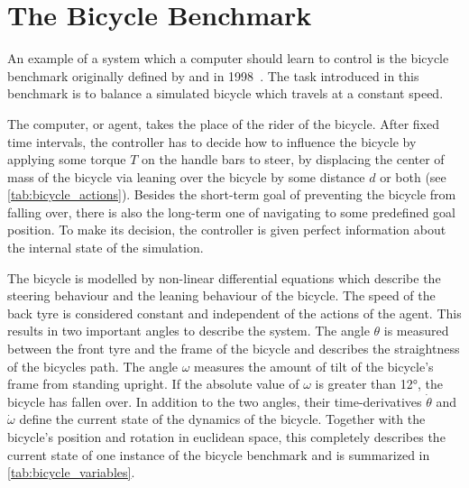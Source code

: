 \chapter{The Bicycle Benchmark}
\label{cha:the_bicycle_benchmark}

An example of a system which a computer should learn to control is the bicycle benchmark originally defined by \Randlov{} and \Alstrom{} in 1998~\cite{randlov_learning_1998}.
The task introduced in this benchmark is to balance a simulated bicycle which travels at a constant speed.

The computer, or agent, takes the place of the rider of the bicycle.
After fixed time intervals, the controller has to decide how to influence the bicycle by applying some torque $T$ on the handle bars to steer, by displacing the center of mass of the bicycle via leaning over the bicycle by some distance $d$ or both (see \cref{tab:bicycle_actions}).
Besides the short-term goal of preventing the bicycle from falling over, there is also the long-term one of navigating to some predefined goal position.
To make its decision, the controller is given perfect information about the internal state of the simulation.

The bicycle is modelled by non-linear differential equations which describe the steering behaviour and the leaning behaviour of the bicycle.
The speed of the back tyre is considered constant and independent of the actions of the agent.
This results in two important angles to describe the system.
The angle $\theta$ is measured between the front tyre and the frame of the bicycle and describes the straightness of the bicycles path.
The angle $\omega$ measures the amount of tilt of the bicycle's frame from standing upright.
If the absolute value of $\omega$ is greater than \ang{12}, the bicycle has fallen over.
In addition to the two angles, their time-derivatives $\dot{\theta}$ and $\dot{\omega}$ define the current state of the dynamics of the bicycle.
Together with the bicycle's position and rotation in euclidean space, this completely describes the current state of one instance of the bicycle benchmark and is summarized in \cref{tab:bicycle_variables}.

